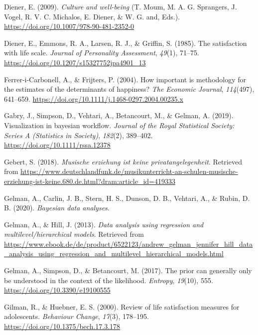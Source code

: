 \documentclass[a4, 12pt]{article}
\begin{document}
\leavevmode\hypertarget{ref-Diener2009}{}%
Diener, E. (2009). \emph{Culture and well-being} (T. Moum, M. A. G. Sprangers, J. Vogel, R. V. C. Michalos, E. Diener, \& W. G. and, Eds.). \url{https://doi.org/10.1007/978-90-481-2352-0}

\leavevmode\hypertarget{ref-Diener1985}{}%
Diener, E., Emmons, R. A., Larsen, R. J., \& Griffin, S. (1985). The satisfaction with life scale. \emph{Journal of Personality Assessment}, \emph{49}(1), 71--75. \url{https://doi.org/10.1207/s15327752jpa4901_13}

\leavevmode\hypertarget{ref-iCarbonell2004}{}%
Ferrer-i-Carbonell, A., \& Frijters, P. (2004). How important is methodology for the estimates of the determinants of happiness? \emph{The Economic Journal}, \emph{114}(497), 641--659. \url{https://doi.org/10.1111/j.1468-0297.2004.00235.x}

\leavevmode\hypertarget{ref-Gabry2019}{}%
Gabry, J., Simpson, D., Vehtari, A., Betancourt, M., \& Gelman, A. (2019). Visualization in bayesian workflow. \emph{Journal of the Royal Statistical Society: Series A (Statistics in Society)}, \emph{182}(2), 389--402. \url{https://doi.org/10.1111/rssa.12378}

\leavevmode\hypertarget{ref-Gebert2018}{}%
Gebert, S. (2018). \emph{Musische erziehung ist keine privatangelegenheit}. Retrieved from \url{https://www.deutschlandfunk.de/musikunterricht-an-schulen-musische-erziehung-ist-keine.680.de.html?dram:article_id=419333}

\leavevmode\hypertarget{ref-Gelman}{}%
Gelman, A., Carlin, J. B., Stern, H. S., Dunson, D. B., Vehtari, A., \& Rubin, D. B. (2020). \emph{Bayesian data analyses}.

\leavevmode\hypertarget{ref-Gelman2013}{}%
Gelman, A., \& Hill, J. (2013). \emph{Data analysis using regression and multilevel/hierarchical models}. Retrieved from \url{https://www.ebook.de/de/product/6522123/andrew_gelman_jennifer_hill_data_analysis_using_regression_and_multilevel_hierarchical_models.html}

\leavevmode\hypertarget{ref-Gelman2017}{}%
Gelman, A., Simpson, D., \& Betancourt, M. (2017). The prior can generally only be understood in the context of the likelihood. \emph{Entropy}, \emph{19}(10), 555. \url{https://doi.org/10.3390/e19100555}

\leavevmode\hypertarget{ref-Gilman2000}{}%
Gilman, R., \& Huebner, E. S. (2000). Review of life satisfaction measures for adolescents. \emph{Behaviour Change}, \emph{17}(3), 178--195. \url{https://doi.org/10.1375/bech.17.3.178}
\end{document}
